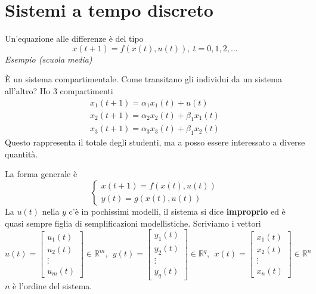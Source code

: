 \documentclass[10pt,a4paper]{book}
\begin{document}
\section{Sistemi a tempo discreto}
Un'equazione alle differenze è del tipo
\begin{equation*}
	x(t+1) =f(x(t) ,u(t)) ,\ t=0,1,2,\dotsc 
\end{equation*}
\textit{Esempio (scuola media)}

È un sistema compartimentale. Come transitano gli individui da un sistema all'altro? Ho 3 compartimenti
\begin{equation*}
	\begin{array}{ l }
		x_1 (t+1)=\alpha _1 x_1 (t)+u(t)             \\
		x_2 (t+1)=\alpha _2 x_2 (t)+\beta _1 x_1 (t) \\
		x_3 (t+1)=\alpha _3 x_3 (t)+\beta _1 x_2 (t) 
	\end{array}
\end{equation*}
Questo rappresenta il totale degli studenti, ma a posso essere interessato a diverse quantità.

La forma generale è
\begin{equation*}
	\boxed{
		\begin{cases}
			x(t+1)=f(x(t),u(t)) \\
			y(t)=g(x(t),u(t))  
		\end{cases}
	}
\end{equation*}
La $u(t)$ nella $y$ c'è in pochissimi modelli, il sistema si dice \textbf{improprio} ed è quasi sempre figlia di semplificazioni modellistiche.
Scriviamo i vettori
\begin{equation*}
	u(t)=\begin{bmatrix}
	u_1 (t)\\
	u_2 (t)\\
	\vdots \\
	u_m (t)
	\end{bmatrix} \in \mathbb{R}^m ,\ \ y(t)=\begin{bmatrix}
	y_1 (t)\\
	y_2 (t)\\
	\vdots \\
	y_q (t)
	\end{bmatrix} \in \mathbb{R}^q ,\ \ x(t)=\begin{bmatrix}
	x_1 (t)\\
	x_2 (t)\\
	\vdots \\
	x_n (t)
	\end{bmatrix} \in \mathbb{R}^n
\end{equation*}
$n$ è l'ordine del sistema.
\end{document}
